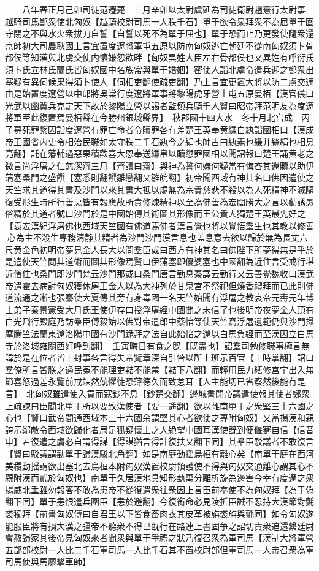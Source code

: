 　　八年春正月己卯司徒范遷薨　三月辛卯以太尉虞延為司徒衛尉趙憙行太尉事　越騎司馬鄭衆使北匈奴【越騎校尉司馬一人秩千石】單于欲令衆拜衆不為屈單于圍守閉之不與水火衆拔刀自誓【自誓以死不為單于屈也】單于恐而止乃更發使隨衆還京師初大司農耿國上言宜置度遼將軍屯五原以防南匈奴逃亡朝廷不從南匈奴須卜骨都侯等知漢與北虜交使内懷嫌怨欲畔【匈奴異姓大臣左右骨都侯也又異姓有呼衍氏須卜氏立林氏蘭氏皆匈奴國中名族常與單于婚姻】密使人詣北虜令遣兵迎之鄭衆出塞疑有異伺候果得須卜使人【伺相吏翻使疏吏翻】乃上言宜更置大將以防二虜交通由是始置度遼營以中郎將吳棠行度遼將軍事將黎陽虎牙營士屯五原曼栢【漢官儀曰光武以幽冀兵克定天下故於黎陽立營以謁者監領兵騎千人賢曰昭帝拜范明友為度遼將軍至此復置焉曼栢縣在今勝州銀城縣界】　秋郡國十四大水　冬十月北宫成　丙子募死罪繫囚詣度遼營有罪亡命者令贖罪各有差楚王英奉黄縑白紈詣國相曰【漢成帝王國省内史令相治民職如太守秩二千石紈今之絹也師古曰紈素也縑并絲絹也相息亮翻】託在藩輔過惡果積歡喜大恩奉送縑帛以贖愆罪國相以聞詔報曰楚王誦黄老之微言尚浮屠之仁慈潔齊三月【齊讀曰齋】與神為誓何嫌何疑當有悔吝其還贖以助伊蒲塞桑門之盛饌【塞悉則翻饌雛戀翻又雛皖翻】初帝聞西域有神其名曰佛因遣使之天竺求其道得其書及沙門以來其書大抵以虚無為宗貴慈悲不殺以為人死精神不滅隨復受形生時所行善惡皆有報應故所貴修煉精神以至為佛善為宏闊勝大之言以勸誘愚俗精於其道者號曰沙門於是中國始傳其術圖其形像而王公貴人獨楚王英最先好之【袁宏漢紀浮屠佛也西域天竺國有佛道焉佛者漢言覺也將以覺悟羣生也其教以修善心為主不殺生專務清静其精者為沙門沙門漢言息也盖息意去欲以歸於無為長丈六尺黄金色初明帝夢見金人長大以問羣臣或曰西方有神其名曰佛陛下所夢得無是乎於是遣使天竺問其道術而圖其形像焉賢曰伊蒲塞即優婆塞也中國翻為近住言受戒行堪近僧住也桑門即沙門梵云沙門那或曰桑門唐言勤息秦譯云勤行又云善覺魏收曰漢武帝遣霍去病討匈奴獲休屠王金人以為大神列於甘泉宫不祭祀但燒香禮拜而已此則佛道流通之漸也張騫使大夏傳其旁有身毒國一名天竺始聞有浮屠之教哀帝元夀元年博士弟子秦景憲受大月氏王使伊存口授浮屠經中國聞之未信了也後明帝夜夢金人頂有白光飛行殿庭乃訪羣臣傅毅始以佛對帝遣郎中蔡愔等使天竺寫浮屠遺範仍與沙門攝摩騰竺法蘭東還洛陽中國有沙門跪拜之法自此始愔之還以白馬負經而至漢因立白馬寺於洛城雍關西好呼到翻】　壬寅晦日有食之旣【既盡也】詔羣司勉修職事極言無諱於是在位者皆上封事各言得失帝覽章深自引咎以所上班示百官【上時掌翻】詔曰羣僚所言皆朕之過民寃不能理吏黠不能禁【黠下八翻】而輕用民力繕修宫宇出入無節喜怒過差永覽前戒竦然兢懼徒恐薄德久而致怠耳【人主能切已省察然後能有是言】　北匈奴雖遣使入貢而寇鈔不息【鈔楚交翻】邊城書閉帝議遣使報其使者鄭衆上疏諫曰臣聞北單于所以要致漢使者【要一遥翻】欲以離南單于之衆堅三十六國之心也【賢曰武帝間通西域本三十六國余謂堅其心者欲使之專附匈奴】又當揚漢和親誇示鄰敵令西域欲歸化者局足狐疑懷土之人絶望中國耳漢使旣到便偃蹇自信【信音申】若復遣之虜必自謂得謀【得謀猶言得計復扶又翻下同】其羣臣駁議者不敢復言【賢曰駁議謂勸單于歸漢駁北角翻】如是南庭動揺烏桓有離心矣【南單于庭在西河美稷動揺謂欲出塞北去烏桓本附匈奴漢置校尉領護使不得與匈奴交通離心謂其心不親附漢而貳於匈奴也】南單于久居漢地具知形埶萬分離析旋為邊害今幸有度遼之衆揚威北垂雖勿報答不敢為患帝不從復遣衆往衆因上言臣前奉使不為匈奴拜【為于偽翻下同】單于恚恨遣兵圍臣【恚於避翻】今復銜命必見陵折臣誠不忍持大漢節對氈裘獨拜【前書匈奴傳曰自君王以下皆食畜肉衣其皮革被旃裘旃與氈同】如令匈奴遂能服臣將有損大漢之彊帝不聽衆不得已旣行在路連上書固争之詔切責衆追還繋廷尉會赦歸家其後帝見匈奴來者聞衆與單于爭禮之狀乃復召衆為軍司馬【漢制大將軍營五部部校尉一人比二千石軍司馬一人比千石其不置校尉部但軍司馬一人帝召衆為軍司馬使與馬廖擊車師】

